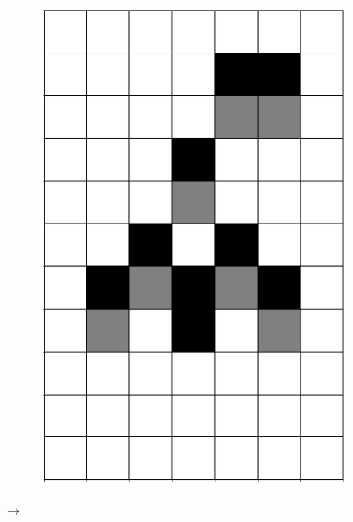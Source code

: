 \documentclass[12pt]{article}
\numberwithin{figure}{section} %
\begin{document}
\begin{figure}[H]
\begin{subfigure}{0.3\textwidth}
     \includegraphics[angle=270,width=\linewidth]{Section4/6.2}
     \subcaption{}
   \end{subfigure}
      {\LARGE$\xrightarrow{}$}
      \newline
   \setcounter{subfigure}{0}
            \begin{subfigure}{0.3\textwidth}
     \centering

\end{subfigure}
\end{figure}
\end{document}
